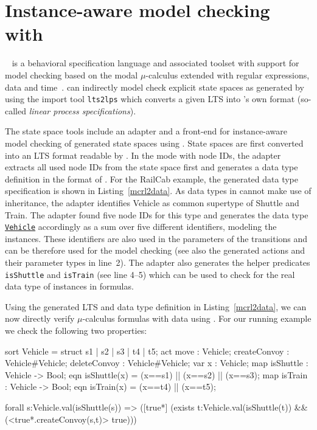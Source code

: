 
\section{Instance-aware model checking with \mcrl}
\label{sec:modelchecking-mcrl2}

\mcrl~\cite{mcrl2} is a behavioral specification language and associated toolset with support for model checking based on the modal $\mu$-calculus extended with regular expressions, data and time~\cite{GM99}. \mcrl can indirectly model check explicit state spaces as generated by \henshin using the import tool \texttt{lts2lps} which converts a given LTS into \mcrl's own format (so-called \emph{linear process specifications}). 

The \henshin state space tools include an adapter and a front-end for instance-aware model checking of generated state spaces using \mcrl. State spaces are first converted into an LTS format readable by \mcrl. In the mode with node IDs, the adapter extracts all used node IDs from the state space first and generates a data type definition in the format of \mcrl. For the RailCab example, the generated data type specification is shown in Listing~\ref{mcrl2data}. As data types in \mcrl cannot make use of inheritance, the adapter identifies \textsf{Vehicle} as common supertype of \textsf{Shuttle} and \textsf{Train}. The adapter found five node IDs for this type and generates the data type \texttt{\underline{Vehicle}} accordingly as a sum over five different identifiers, modeling the instances. These identifiers are also used in the parameters of the transitions and can be therefore used for the model checking (see also the generated actions and their parameter types in line~2). The adapter also generates the helper predicates \texttt{isShuttle} and \texttt{isTrain} (see line 4--5) which can be used to check for the real data type of instances in formulas. 

Using the generated LTS and data type definition in Listing~\ref{mcrl2data}, we can now directly verify $\mu$-calculus formulas with data using \mcrl. For our running example we check the following two properties:


\begin{mcrlcode}[float=t,aboveskip=-1mm,belowskip=-1mm,
  caption={Generated \mcrl data type specification for the RailCab example},label={mcrl2data}]
sort Vehicle = struct s1 | s2 | s3 | t4 | t5;
act move : Vehicle;    createConvoy : Vehicle#Vehicle;    deleteConvoy : Vehicle#Vehicle;
var x : Vehicle;
map isShuttle : Vehicle -> Bool;       eqn isShuttle(x) = (x==s1) || (x==s2) || (x==s3);
map isTrain : Vehicle -> Bool;         eqn isTrain(x) = (x==t4) || (x==t5);
\end{mcrlcode}
\begin{mcrlcode}[float=t,,aboveskip=0mm,belowskip=-2mm,
  caption={Example property \emph{a)}},label={propA}]
forall s:Vehicle.val(isShuttle(s)) => 
 ([true*] (exists t:Vehicle.val(isShuttle(t)) && (<true*.createConvoy(s,t)> true)))
\end{mcrlcode}

